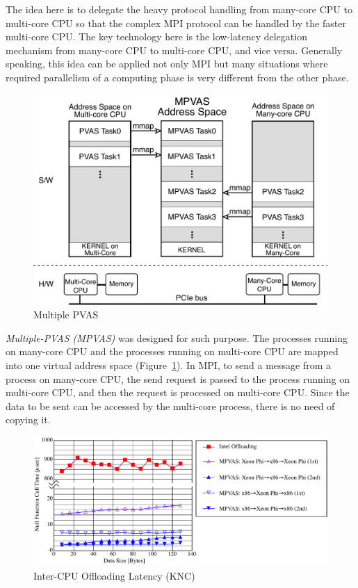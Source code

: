 The idea here is to delegate the heavy protocol handling from
many-core CPU to multi-core CPU so that the complex MPI protocol can
be handled by the faster multi-core CPU. The key technology here is
the low-latency delegation mechanism from many-core CPU to multi-core 
CPU, and vice versa. Generally speaking, this idea can be applied not
only MPI but many situations where required parallelism of a
computing phase is very different from the other phase.

\begin{figure}[ht]
\begin{center}
\includegraphics[width=0.8\columnwidth]{Figs/MPVAS.pdf}
  \caption{Multiple PVAS}
  \label{fig:mpvas}
\end{center}
\end{figure}

{\em Multiple-PVAS (MPVAS)} was designed for such purpose. The
processes running on many-core CPU and the processes running on
multi-core CPU are mapped into one virtual address space
(Figure~\ref{fig:mpvas})\cite{fukazawa-thesis}. In MPI, to 
send a message from a process on many-core CPU, the send request is
passed to the process running on multi-core CPU, and then the request
is processed on multi-core CPU. Since the data to be sent can be
accessed by the multi-core process, there is no need of copying it. 

\begin{figure}[ht]
\begin{center}
\includegraphics[width=0.95\columnwidth]{Figs/MPVAS-TAT.pdf}
  \caption{Inter-CPU Offloading Latency (KNC)}
  \label{fig:mpvas-tat}
\end{center}
\end{figure}

